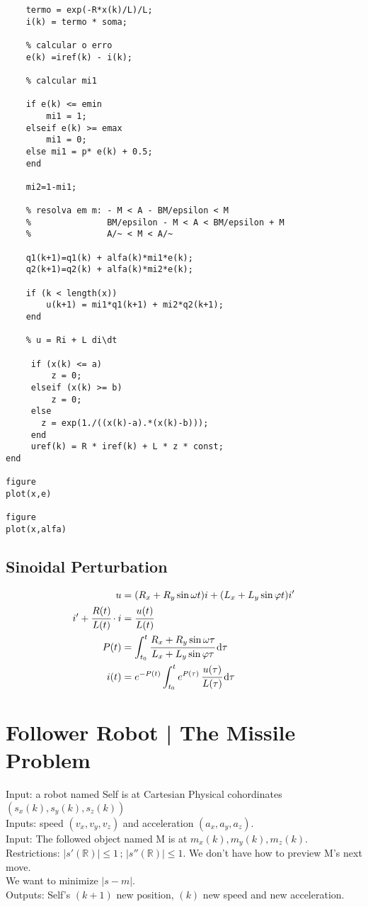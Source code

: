 \documentclass[11pt]{article}
\begin{document}
\begin{verbatim}
    termo = exp(-R*x(k)/L)/L;
    i(k) = termo * soma;

    % calcular o erro
    e(k) =iref(k) - i(k);

    % calcular mi1

    if e(k) <= emin
        mi1 = 1;
    elseif e(k) >= emax
        mi1 = 0;
    else mi1 = p* e(k) + 0.5;
    end

    mi2=1-mi1;

    % resolva em m: - M < A - BM/epsilon < M
    %               BM/epsilon - M < A < BM/epsilon + M
    %               A/~ < M < A/~

    q1(k+1)=q1(k) + alfa(k)*mi1*e(k);
    q2(k+1)=q2(k) + alfa(k)*mi2*e(k);

    if (k < length(x))
        u(k+1) = mi1*q1(k+1) + mi2*q2(k+1);
    end

    % u = Ri + L di\dt

     if (x(k) <= a)
         z = 0;
     elseif (x(k) >= b)
         z = 0;
     else
       z = exp(1./((x(k)-a).*(x(k)-b)));
     end
     uref(k) = R * iref(k) + L * z * const;
end

figure
plot(x,e)

figure
plot(x,alfa)
\end{verbatim}

\subsection{Sinoidal Perturbation}

\begin{align}
  u &= (R_x + R_y \sin \omega t) i + (L_x + L_y \sin \varphi t) i' \\
  i' + \cfrac{R(t)}{L(t)}\cdot i &= \cfrac{u(t)}{L(t)} \\
  P(t) &= \int_{t_0}^t \cfrac{R_x + R_y \sin \omega \tau}{L_x + L_y \sin \varphi \tau}\,\mathrm{d}\tau \\
  i(t) &= e^{-P(t)} \int_{t_0}^t e^{P(\tau)}\, \cfrac{u(\tau)}{L(\tau)}\,\mathrm{d}\tau
\end{align}

\section{Follower Robot | The Missile Problem}

\begin{flushleft}
Input: a robot named Self is at Cartesian Physical cohordinates $(s_x(k), s_y(k), s_z(k))$ \\
Inputs: speed $(v_x, v_y, v_z)$ and acceleration $(a_x, a_y, a_z)$. \\
Input: The followed object named M is at $m_x(k), m_y(k), m_z(k)$. \\
Restrictions: $|s'(\mathbb{R})| \le 1\,;\,|s''(\mathbb{R})| \le 1$. We don't have how to preview M's next move. \\
We want to minimize $|s - m|$. \\
Outputs: Self's $(k + 1)$ new position, $(k)$ new speed and new acceleration.
\end{flushleft}
\end{document}
